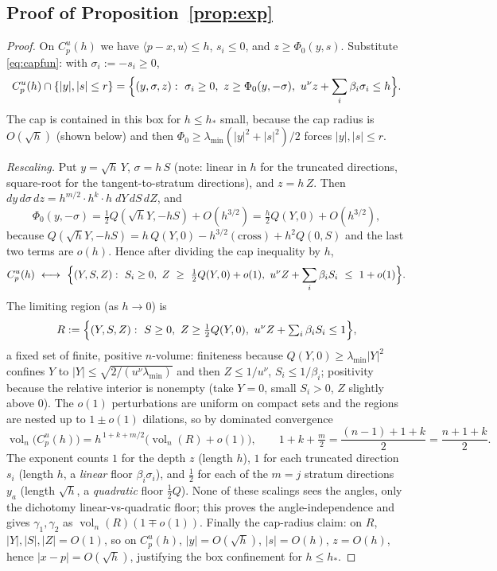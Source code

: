 \documentclass[11pt]{article}
\theoremstyle{definition}
\theoremstyle{remark}
\newcommand{\vol}{\operatorname{vol}}
\begin{document}
\subsection{Proof of Proposition~\ref{prop:exp}}

\begin{proof}
On $C_p^u(h)$ we have $\langle p-x,u\rangle\le h$, $s_i\le0$, and
$z\ge\Phi_0(y,s)$.  Substitute \eqref{eq:capfun}: with $\sigma_i:=-s_i\ge0$,
\begin{equation}\label{eq:capset}
C_p^u(h)\cap\{|y|,|s|\le r\}
=\Bigl\{(y,\sigma,z):\ \sigma_i\ge0,\ z\ge\Phi_0(y,-\sigma),\
u^\nu z+\sum_i\beta_i\sigma_i\le h\Bigr\}.
\end{equation}
The cap is contained in this box for $h\le h_*$ small, because the cap radius
is $O(\sqrt h)$ (shown below) and then $\Phi_0\ge\lambda_{\min}(|y|^2+|s|^2)/2$
forces $|y|,|s|\le r$.

\emph{Rescaling.}  Put $y=\sqrt h\,Y$, $\sigma=h\,S$ (note: linear in $h$ for
the truncated directions, square-root for the tangent-to-stratum directions),
and $z=h\,Z$.  Then $dy\,d\sigma\,dz=h^{m/2}\cdot h^{k}\cdot h\;dY\,dS\,dZ$, and
\[
\Phi_0(y,-\sigma)=\tfrac12 Q(\sqrt h Y,-hS)+O(h^{3/2})
=\tfrac{h}{2}Q(Y,0)+O(h^{3/2}),
\]
because $Q(\sqrt h Y,-hS)=h\,Q(Y,0)-h^{3/2}(\text{cross})+h^2Q(0,S)$ and the
last two terms are $o(h)$.  Hence after dividing the cap inequality by $h$,
\begin{equation}\label{eq:rescaled}
C_p^u(h)\ \longleftrightarrow\
\Bigl\{(Y,S,Z):\ S_i\ge0,\
Z\ \ge\ \tfrac12 Q(Y,0)+o(1),\
u^\nu Z+\sum_i\beta_i S_i\ \le\ 1+o(1)\Bigr\}.
\end{equation}
The limiting region (as $h\to0$) is
\[
R:=\Bigl\{(Y,S,Z):\ S\ge0,\ Z\ge\tfrac12 Q(Y,0),\
u^\nu Z+\textstyle\sum_i\beta_iS_i\le1\Bigr\},
\]
a fixed set of finite, positive $n$-volume:
finiteness because $Q(Y,0)\ge\lambda_{\min}|Y|^2$ confines $Y$ to
$|Y|\le\sqrt{2/(u^\nu\lambda_{\min})}$ and then $Z\le1/u^\nu$, $S_i\le
1/\beta_i$; positivity because the relative interior is nonempty (take $Y=0$,
small $S_i>0$, $Z$ slightly above $0$).  The $o(1)$ perturbations are uniform
on compact sets and the regions are nested up to $1\pm o(1)$ dilations, so by
dominated convergence
\[
\vol_n\!\bigl(C_p^u(h)\bigr)
=h^{\,1+k+m/2}\bigl(\vol_n(R)+o(1)\bigr),
\qquad 1+k+\tfrac m2=\frac{(n-1)+1+k}2=\frac{n+1+k}2 .
\]
The exponent counts $1$ for the depth $z$ (length $h$), $1$ for each truncated
direction $s_i$ (length $h$, a \emph{linear} floor $\beta_i\sigma_i$), and
$\tfrac12$ for each of the $m=j$ stratum directions $y_a$ (length $\sqrt h$, a
\emph{quadratic} floor $\tfrac12 Q$).  None of these scalings sees the angles,
only the dichotomy linear-vs-quadratic floor; this proves the
angle-independence and gives $\gamma_1,\gamma_2$ as $\vol_n(R)(1\mp o(1))$.
Finally the cap-radius claim: on $R$, $|Y|,|S|,|Z|=O(1)$, so on $C_p^u(h)$,
$|y|=O(\sqrt h)$, $|s|=O(h)$, $z=O(h)$, hence $|x-p|=O(\sqrt h)$, justifying the
box confinement for $h\le h_*$.
\end{proof}
\end{document}
